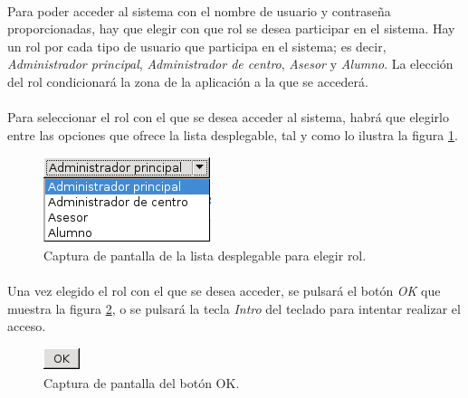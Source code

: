   \paragraph{}Para poder acceder al sistema con el nombre de usuario y
  contraseña proporcionadas, hay que elegir con que rol se desea participar en
  el sistema. Hay un rol por cada tipo de usuario que participa en el sistema;
  es decir, \textit{Administrador principal}, \textit{Administrador de centro},
  \textit{Asesor} y \textit{Alumno}. La elección del rol condicionará la zona de
  la aplicación a la que se accederá.

  \paragraph{}Para seleccionar el rol con el que se desea acceder al sistema,
  habrá que elegirlo entre las opciones que ofrece la lista desplegable, tal y
  como lo ilustra la figura \ref{capturaListaDesplegableRol}.

  \begin{figure}[!ht]
    \begin{center}
      \includegraphics[]{4.Funcionamiento_Aplicacion/4.2.Acceso_Sistema/Capturas/lista_desplegable_rol.png}
      \caption{Captura de pantalla de la lista desplegable para elegir rol.}
      \label{capturaListaDesplegableRol}
    \end{center}
  \end{figure}

  \paragraph{}Una vez elegido el rol con el que se desea acceder, se pulsará
  el botón \textit{OK} que muestra la figura \ref{capturaBotonOK}, o se pulsará
  la tecla \textit{Intro} del teclado para intentar realizar el acceso.

  \begin{figure}[!ht]
    \begin{center}
      \includegraphics[]{4.Funcionamiento_Aplicacion/4.2.Acceso_Sistema/Capturas/boton_ok.png}
      \caption{Captura de pantalla del botón OK.}
      \label{capturaBotonOK}
    \end{center}
  \end{figure}

